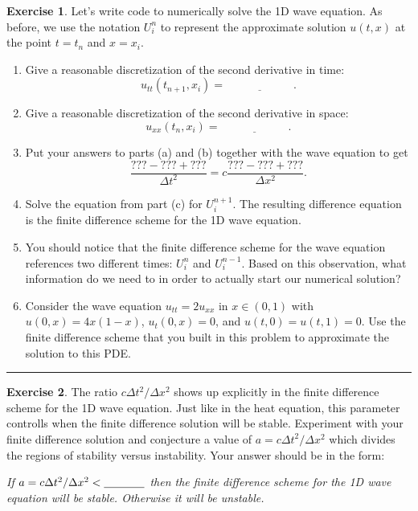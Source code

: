 \documentclass[
]{book}
\providecommand{\tightlist}{%
  \setlength{\itemsep}{0pt}\setlength{\parskip}{0pt}}
\theoremstyle{definition}
\theoremstyle{definition}
\theoremstyle{definition}
\newtheorem{exercise}{Exercise}[chapter]
\theoremstyle{remark}
\begin{document}
\begin{exercise}
\protect\hypertarget{exr:unnamed-chunk-575}{}{\label{exr:unnamed-chunk-575} }Let's write code to numerically solve the 1D wave equation. As before, we use the notation \(U_i^n\) to represent the approximate solution \(u(t,x)\) at the point \(t=t_n\) and \(x=x_i\).

\begin{enumerate}
\def\labelenumi{\alph{enumi}.}
\tightlist
\item
  Give a reasonable discretization of the second derivative in time:
  \[ u_{tt}(t_{n+1}, x_i) = \underline{\hspace{1in}}. \]
\item
  Give a reasonable discretization of the second derivative in space:
  \[ u_{xx}(t_n, x_i) = \underline{\hspace{1in}}. \]
\item
  Put your answers to parts (a) and (b) together with the wave equation to get
  \[ \frac{??? - ??? + ???}{\Delta t^2} = c \frac{??? - ??? + ???}{\Delta x^2}. \]
\item
  Solve the equation from part (c) for \(U_i^{n+1}\). The resulting difference equation is the finite difference scheme for the 1D wave equation.\\
\item
  You should notice that the finite difference scheme for the wave equation references two different times: \(U_i^n\) and \(U_i^{n-1}\). Based on this observation, what information do we need to in order to actually start our numerical solution?
\item
  Consider the wave equation \(u_{tt} = 2 u_{xx}\) in \(x \in (0,1)\) with \(u(0,x) = 4x(1-x)\), \(u_t(0,x) = 0\), and \(u(t,0) = u(t,1) = 0\). Use the finite difference scheme that you built in this problem to approximate the solution to this PDE.
\end{enumerate}
\end{exercise}

\begin{center}\rule{0.5\linewidth}{0.5pt}\end{center}

\begin{exercise}
\protect\hypertarget{exr:unnamed-chunk-576}{}{\label{exr:unnamed-chunk-576} }The ratio \(c\Delta t^2 / \Delta x^2\) shows up explicitly in the finite difference scheme for the 1D wave equation. Just like in the heat equation, this parameter controlls when the finite difference solution will be stable. Experiment with your finite difference solution and conjecture a value of \(a = c \Delta t^2 / \Delta x^2\) which divides the regions of stability versus instability. Your answer should be in the form:

\emph{If \(a = c\Delta t^2 / \Delta x^2 < \underline{\hspace{0.5in}}\) then the finite difference scheme for the 1D wave equation will be stable. Otherwise it will be unstable.}
\end{exercise}
\end{document}

